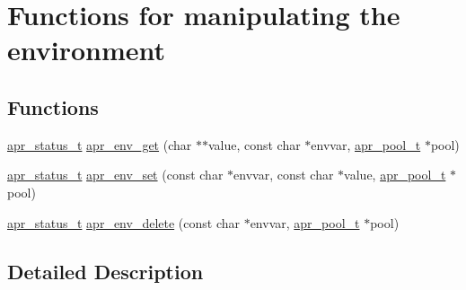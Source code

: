 \hypertarget{group__apr__env}{\section{Functions for manipulating the environment}
\label{group__apr__env}
}
\subsection*{Functions}
\begin{DoxyCompactItemize}
\item 
\hyperlink{group__apr__errno_gaf76ee4543247e9fb3f3546203e590a6c}{apr\-\_\-status\-\_\-t} \hyperlink{group__apr__env_gada7cd6ccada789a3738f8fc6334da809}{apr\-\_\-env\-\_\-get} (char $\ast$$\ast$value, const char $\ast$envvar, \hyperlink{group__apr__pools_gaf137f28edcf9a086cd6bc36c20d7cdfb}{apr\-\_\-pool\-\_\-t} $\ast$pool)
\item 
\hyperlink{group__apr__errno_gaf76ee4543247e9fb3f3546203e590a6c}{apr\-\_\-status\-\_\-t} \hyperlink{group__apr__env_gae11f733a639393a35e82c795f4ecd470}{apr\-\_\-env\-\_\-set} (const char $\ast$envvar, const char $\ast$value, \hyperlink{group__apr__pools_gaf137f28edcf9a086cd6bc36c20d7cdfb}{apr\-\_\-pool\-\_\-t} $\ast$pool)
\item 
\hyperlink{group__apr__errno_gaf76ee4543247e9fb3f3546203e590a6c}{apr\-\_\-status\-\_\-t} \hyperlink{group__apr__env_ga2bfac0686199b2fee97a7638df7cbfdc}{apr\-\_\-env\-\_\-delete} (const char $\ast$envvar, \hyperlink{group__apr__pools_gaf137f28edcf9a086cd6bc36c20d7cdfb}{apr\-\_\-pool\-\_\-t} $\ast$pool)
\end{DoxyCompactItemize}


\subsection{Detailed Description}


